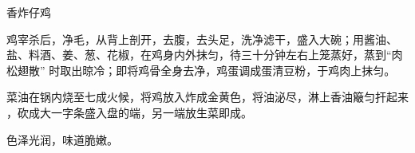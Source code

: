 \begin{recipe}[喇嘛仔鸡]{香炸仔鸡}

\ingredients


\preparation

\step 鸡宰杀后，净毛，从背上剖开，去腹，去头足，洗净滤干，盛入大碗；用酱油、
盐、料酒、姜、葱、花椒，在鸡身内外抹匀，待三十分钟左右上笼蒸好，蒸到“肉松翅散”
时取出晾冷；即将鸡骨全身去净，鸡蛋调成蛋清豆粉，于鸡肉上抹匀。

\step 菜油在锅内烧至七成火候，将鸡放入炸成金黄色，将油泌尽，淋上香油簸匀扞起来
，砍成大一字条盛入盘的端，另一端放生菜即成。

\features

色泽光润，味道脆嫩。

\end{recipe}

